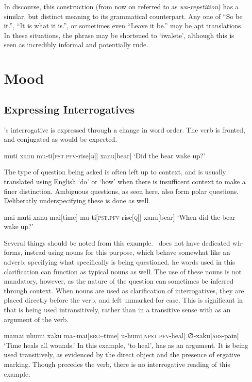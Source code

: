 In discourse, this construction (from now on referred to as \textit{wa-repetition}) has a similar, but distinct meaning to its grammatical counterpart. Any one of ``So be it.'', ``It is what it is.'', or sometimes even ``Leave it be.'' may be apt translations. In these situations, the phrase may be shortened to `iwalete', although this is seen as incredibly informal and potentially rude.

\section{Mood}
\subsection{Expressing Interrogatives}

\langname 's interrogative is expressed through a change in word order. The verb is fronted, and conjugated as would be expected.

\ex
\begingl
\glpreamble muti xanu
\endpreamble
mu-ti[\textsc{pst.pfv-}rise\textsc{[q]}]
xanu[bear]
\glft `Did the bear wake up?'
\endgl
\xe

The type of question being asked is often left up to context, and is usually translated using English `do' or `how' when there is insufficent context to make a finer distinction. Ambiguous questions, as seen here, also form polar questions. Deliberatly underspecifying these is done as well.

\ex
\begingl
\glpreamble mai muti xanu
\endpreamble
mai[time]
mu-ti[\textsc{pst.pfv-}rise\textsc{[q]}]
xanu[bear]
\glft `When did the bear wake up?'
\endgl
\xe

Several things should be noted from this example. \langname\ does not have dedicated wh-forms, instead using nouns for this purpose, which behave somewhat like an adverb, specifying what specifically is being questioned. he words used in this clarification can function as typical nouns as well. The use of these nouns is not mandatory, however, as the nature of the question can sometimes be inferred through context. When nouns are used as clarification of interrogatives, they are placed directly before the verb, and left unmarked for case. This is significant in that  is being used intransitively, rather than in a transitive sense with  as an argument of the verb.

\ex
\begingl
\glpreamble mamai uhumi xaku
\endpreamble
ma\textasciitilde mai[\textsc{erg\textasciitilde}time]
u-humi[\textsc{npst.pfv-}heal]
∅-xaku[\textsc{abs-}pain]
\glft `Time heals all wounds.'
\endgl
\xe
In this example,  `to heal', has  as an argument. It is being used transitively, as evidenced by the direct object  and the presence of ergative marking. Though  precedes the verb, there is no interrogative reading of this example.


